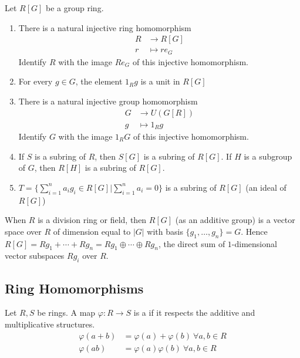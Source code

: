 \begin{remark}
Let $R[G]$ be a group ring.
\begin{enumerate}[label=(\roman*)]
\item There is a natural injective ring homomorphism 
\begin{align}
R &\rightarrow R[G] \nonumber \\
r &\mapsto r e_G \nonumber
\end{align}
Identify $R$ with the image $R e_G$ of this injective homomorphism.
\item For every $g \in G$, the element $1_R g$ is a unit in $R[G]$
\item There is a natural injective group homomorphism 
\begin{align}
G &\rightarrow U(G[R]) \nonumber \\
g &\mapsto 1_R g \nonumber
\end{align}
Identify $G$ with the image $1_R G$ of this injective homomorphism.
\item If $S$ is a subring of $R$, then $S[G]$ is a subring of $R[G]$. If $H$ is a subgroup of $G$, then $R[H]$ is a subring of $R[G]$.
\item $T = \{\sum_{i=1}^{n} a_i g_i \in R[G] | \sum_{i=1}^{n} a_i = 0\}$ is a subring of $R[G]$ (an ideal of $R[G]$)
\end{enumerate}
\end{remark}


\begin{remark}
When $R$ is a division ring or field, then $R[G]$ (as an additive group) is a vector space over $R$ of dimension equal to $\left| G \right|$ with basis $\{g_1, \ldots, g_n\} = G$.
Hence $R[G] = Rg_1 + \cdots + Rg_n = Rg_1 \oplus \cdots \oplus Rg_n$, the direct sum of $1$-dimensional vector subspaces $Rg_i$ over $R$.\\
\end{remark}


\subsection{Ring Homomorphisms}

\begin{definition}
Let $R, S$ be rings. A map $\varphi: R \rightarrow S$ is a  if it respects the additive and multiplicative structures.\\
\begin{align}
\varphi(a+b) &= \varphi(a) + \varphi(b) \ \forall a, b \in R \nonumber \\
\varphi(ab) &= \varphi(a)\varphi(b) \ \forall a, b \in R \nonumber
\end{align}
\end{definition}


